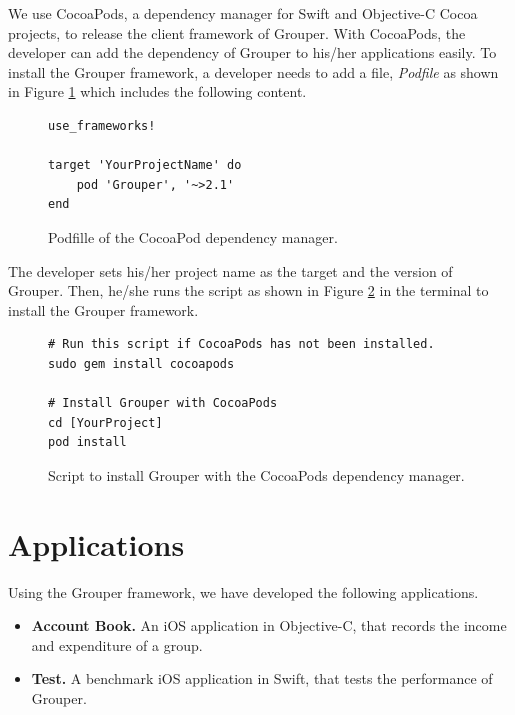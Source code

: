 \documentclass[a4paper,11pt]{report}
\begin{document}
We use CocoaPods\cite{cocoapods}, a dependency manager for Swift and Objective-C Cocoa projects, to release the client framework of Grouper.
With CocoaPods, the developer can add the dependency of Grouper to his/her applications easily.
To install the Grouper framework, a developer needs to add a file, \emph{Podfile} as shown in Figure \ref{fig:podfile} which includes the following content.

\begin{figure}
\begin{lstlisting}[frame=none language=Ruby] 
use_frameworks!

target 'YourProjectName' do
    pod 'Grouper', '~>2.1'
end
\end{lstlisting}
\caption{Podfille of the CocoaPod dependency manager.}
\label{fig:podfile}
\end{figure}

The developer sets his/her project name as the target and the version of Grouper.
Then, he/she runs the script as shown in Figure \ref{fig:install_grouper} in the terminal to install the Grouper framework.

\begin{figure}
\begin{lstlisting}[frame=none language=shell] 
# Run this script if CocoaPods has not been installed.
sudo gem install cocoapods

# Install Grouper with CocoaPods
cd [YourProject]
pod install
\end{lstlisting}
\caption{Script to install Grouper with the CocoaPods dependency manager.}
\label{fig:install_grouper}
\end{figure}

\section{Applications} \label{section:application}

Using the Grouper framework, we have developed the following applications. 

\begin{itemize}
	\setlength{\itemsep}{1pt}
	\setlength{\parskip}{0pt}
	\setlength{\parsep}{0pt}
	\item \textbf{Account Book.} An iOS application in Objective-C, that records the income and expenditure of a group.
	\item \textbf{Test.} A benchmark iOS application in Swift, that tests the performance of Grouper.
\end{itemize}
\end{document}
